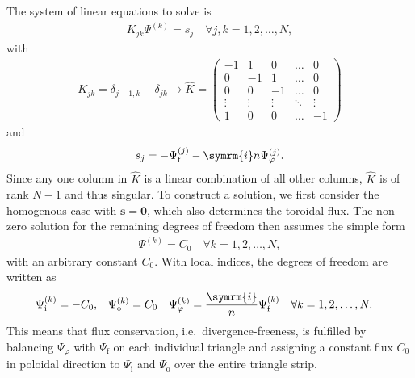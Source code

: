 \documentclass[a4paper, twoside, 10pt, english]{article}
\numberwithin{equation}{section}
\let\temp\varrho
\let\varrho\rho
\let\rho\temp
\let\temp\vartheta
\let\vartheta\theta
\let\theta\temp
\let\temp\varphi
\let\varphi\phi
\let\phi\temp
\let\vec\symbf
\newcommand*\im{\ensuremath{\symrm{i}}}  %
\newcommand*\fs{\ensuremath{\textrm{f}}}  %
\newcommand*\inw{\ensuremath{\textrm{i}}}  %
\newcommand*\out{\ensuremath{\textrm{o}}}  %
\begin{document}
The system of linear equations to solve is
\begin{gather}
  K_{jk} \Psi^{(k)} = s_{j} \quad \forall j, k = 1, 2, \dotsc, N,
\end{gather}
with
\begin{gather}
  K_{jk} = \delta_{j-1, k} - \delta_{jk} \rightarrow \hat{K} = \begin{pmatrix}
    -1   &    1   &    0   & \hdots &    0   \\
     0   &   -1   &    1   & \hdots &    0   \\
     0   &    0   &   -1   & \hdots &    0   \\
  \vdots & \vdots & \vdots & \ddots & \vdots \\
     1   &    0   &    0   & \hdots &   -1
  \end{pmatrix}
\end{gather}
and
\begin{gather}
  s_{j} = -\Psi_{\fs}^{(j)} - \im n \Psi_{\phi}^{(j)}.
\end{gather}
Since any one column in $\hat{K}$ is a linear combination of all other columns, $\hat{K}$ is of rank $N - 1$ and thus singular. To construct a solution, we first consider the homogenous case with $\vec{s} = \vec{0}$, which also determines the toroidal flux. The non-zero solution for the remaining degrees of freedom then assumes the simple form
\begin{gather}
  \Psi^{(k)} = C_{0} \quad \forall k = 1, 2, \dotsc, N,
\end{gather}
with an arbitrary constant $C_{0}$. With local indices, the degrees of freedom are written as 
\begin{align}
  \Psi_{\inw}^{(k)} &= -C_{0}, & \Psi_{\out}^{(k)} &= C_{0} & \Psi_{\phi}^{(k)} &= \frac{\im}{n} \Psi_{\fs}^{(k)} \quad \forall k = 1, 2, \dotsc, N. \label{eq:Psi_hom}
\end{align}
This means that flux conservation, i.e.\ divergence-freeness, is fulfilled by balancing $\Psi_{\phi}$ with $\Psi_{\fs}$ on each individual triangle and assigning a constant flux $C_{0}$ in poloidal direction to $\Psi_{\inw}$ and $\Psi_{\out}$ over the entire triangle strip.
\end{document}
